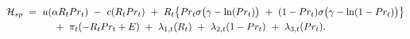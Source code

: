 \begin{equation}
\begin{split}
    \mathcal{H}_{sp} \ 
    & = \ u(\alpha R_{t} Pr_{t}) \ - \ c(R_{t} Pr_{t}) \ + \ R_{t} \big\{ Pr_{t} \sigma \big( \gamma - \ln(Pr_{t}) \big) \ + \ (1 - Pr_{t}) \sigma \big( \gamma - \ln( 1 - Pr_{t}) \big) \big\} \\
    & \hspace{1.0cm} + \ \pi_{t} (-R_{t}Pr_{t} + E) \ + \ \lambda_{1,t} (R_{t}) \ + \ \lambda_{2,t} (1 - Pr_{t}) \ + \ \lambda_{3,t} (Pr_{t}).
\end{split}
\label{Equation:Social-Planners-Problem_Hamiltonian-Lagrangian}
\end{equation}